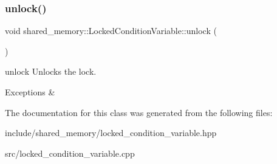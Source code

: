 \subsubsection{\texorpdfstring{unlock()}{unlock()}}
{\footnotesize\ttfamily void shared\+\_\+memory\+::\+Locked\+Condition\+Variable\+::unlock (\begin{DoxyParamCaption}{ }\end{DoxyParamCaption})}



unlock Unlocks the lock. 


\begin{DoxyExceptions}{Exceptions}
{\em } & \\
\hline
\end{DoxyExceptions}


The documentation for this class was generated from the following files\+:\begin{DoxyCompactItemize}
\item 
include/shared\+\_\+memory/locked\+\_\+condition\+\_\+variable.\+hpp\item 
src/locked\+\_\+condition\+\_\+variable.\+cpp\end{DoxyCompactItemize}
